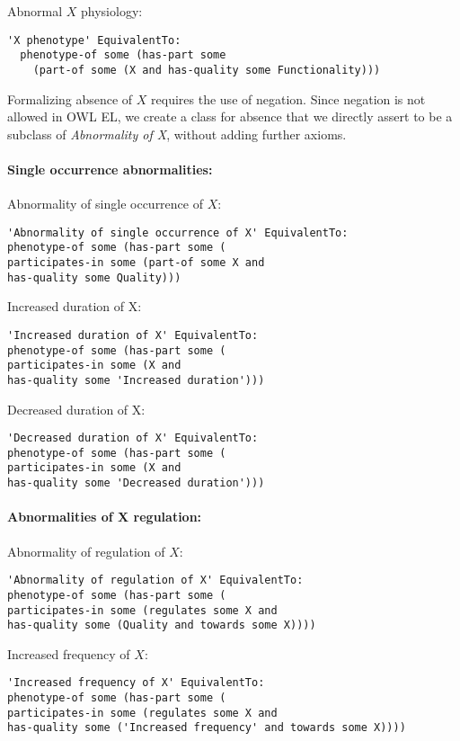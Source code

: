 \documentclass{article}
\begin{document}
Abnormal $X$ physiology:
\begin{verbatim}
'X phenotype' EquivalentTo:
  phenotype-of some (has-part some
    (part-of some (X and has-quality some Functionality)))
\end{verbatim}

Formalizing absence of $X$ requires the use of negation. Since
negation is not allowed in OWL EL, we create a class for absence that
we directly assert to be a subclass of {\em Abnormality of X}, without
adding further axioms.

\paragraph{Single occurrence abnormalities:}
Abnormality of single occurrence of $X$:
\begin{verbatim}
'Abnormality of single occurrence of X' EquivalentTo:
phenotype-of some (has-part some (
participates-in some (part-of some X and
has-quality some Quality)))
\end{verbatim}

Increased duration of X:
\begin{verbatim}
'Increased duration of X' EquivalentTo:
phenotype-of some (has-part some (
participates-in some (X and
has-quality some 'Increased duration')))
\end{verbatim}

Decreased duration of X:
\begin{verbatim}
'Decreased duration of X' EquivalentTo:
phenotype-of some (has-part some (
participates-in some (X and
has-quality some 'Decreased duration')))
\end{verbatim}

\paragraph{Abnormalities of X regulation:}
Abnormality of regulation of $X$:
\begin{verbatim}
'Abnormality of regulation of X' EquivalentTo:
phenotype-of some (has-part some (
participates-in some (regulates some X and
has-quality some (Quality and towards some X))))
\end{verbatim}

Increased frequency of $X$:
\begin{verbatim}
'Increased frequency of X' EquivalentTo:
phenotype-of some (has-part some (
participates-in some (regulates some X and
has-quality some ('Increased frequency' and towards some X))))
\end{verbatim}
\end{document}
